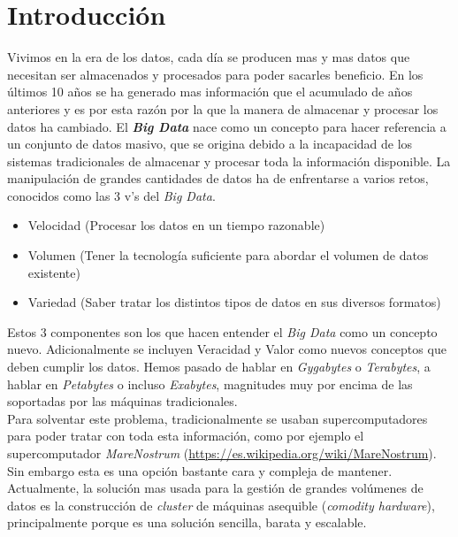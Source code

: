 \chapter*{Introducción}%

Vivimos en la era de los datos, cada día se producen mas y mas datos que
necesitan ser almacenados y procesados para poder sacarles beneficio.
En los últimos 10 años se ha generado mas información que el acumulado de años
anteriores y es por esta razón  por la que la manera de almacenar y procesar
los datos ha cambiado.
El \textbf{\textit{Big Data}}\label{big_data_def} nace como un concepto para hacer referencia a un 
conjunto de datos masivo, que se origina debido a la incapacidad de los sistemas tradicionales 
de almacenar y procesar toda la información disponible.
La manipulación de grandes cantidades de datos ha de enfrentarse a varios
retos, conocidos como las 3 v's del \textit{Big Data}.
\begin{itemize}
  \item Velocidad (Procesar los datos en un tiempo razonable)
  \item Volumen (Tener la tecnología suficiente para abordar el volumen de datos existente)
  \item Variedad (Saber tratar los distintos tipos de datos en sus diversos formatos)
\end{itemize}
Estos 3 componentes son los que hacen entender el \textit{Big Data} como un 
concepto nuevo. Adicionalmente se incluyen Veracidad y Valor como nuevos conceptos que deben cumplir los datos.
Hemos pasado de hablar en \textit{Gygabytes} o \textit{Terabytes}, a hablar 
en \textit{Petabytes} o incluso \textit{Exabytes}, magnitudes muy por encima de las soportadas 
por las máquinas tradicionales.\\
Para solventar este problema, tradicionalmente se usaban supercomputadores para poder tratar con toda esta
información, como por ejemplo el supercomputador \textit{MareNostrum} (\url{https://es.wikipedia.org/wiki/MareNostrum}). 
Sin embargo esta es una opción bastante cara y compleja de mantener. Actualmente, la solución mas
usada para la gestión de grandes volúmenes de datos es la construcción de \textit{cluster} de máquinas asequible
(\textit{comodity hardware}), principalmente porque es una solución sencilla, barata y
escalable.

